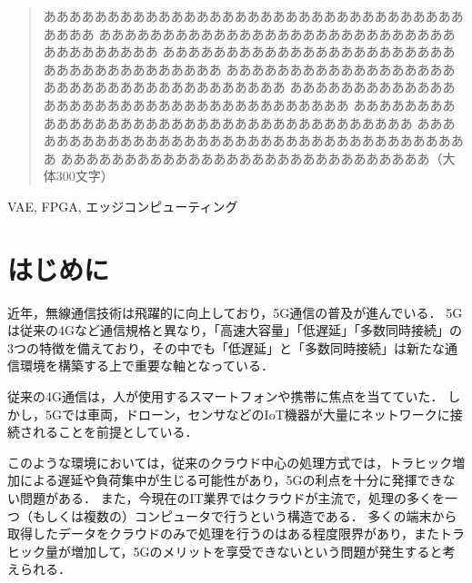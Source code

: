 \documentclass[paper]{ieicej}
\begin{document}
\begin{abstract}
あああああああああああああああああああああああああああああああああああああ
あああああああああああああああああああああああああああああああああああああ
あああああああああああああああああああああああああああああああああああああ
あああああああああああああああああああああああああああああああああああああ
あああああああああああああああああああああああああああああああああああああ
あああああああああああああああああああああああああああああああああああああ
あああああああああああああああああああああああああああああああああああああ
あああああああああああああああああああああああああああああ（大体300文字）
\end{abstract}
\begin{keyword}
VAE, FPGA, エッジコンピューティング
\end{keyword}
\maketitle

\section{はじめに}
近年，無線通信技術は飛躍的に向上しており，5G通信の普及が進んでいる．
5Gは従来の4Gなど通信規格と異なり，「高速大容量」「低遅延」「多数同時接続」の3つの特徴を備えており，その中でも「低遅延」と「多数同時接続」は新たな通信環境を構築する上で重要な軸となっている\cite{5g}．

従来の4G通信は，人が使用するスマートフォンや携帯に焦点を当てていた．
しかし，5Gでは車両，ドローン，センサなどのIoT機器が大量にネットワークに接続されることを前提としている．

このような環境においては，従来のクラウド中心の処理方式では，トラヒック増加による遅延や負荷集中が生じる可能性があり，5Gの利点を十分に発揮できない問題がある．
また，今現在のIT業界ではクラウドが主流で，処理の多くを一つ（もしくは複数の）コンピュータで行うという構造である．
多くの端末から取得したデータをクラウドのみで処理を行うのはある程度限界があり，またトラヒック量が増加して，5Gのメリットを享受できないという問題が発生すると考えられる．
\end{document}
